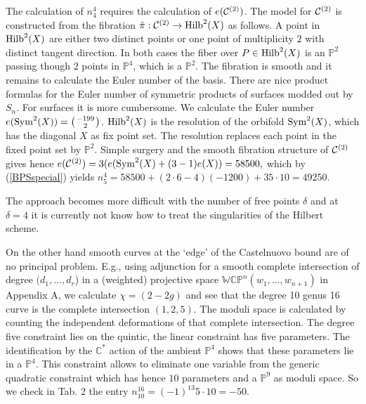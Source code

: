 \documentclass[12pt]{article}
\begin{document}
The calculation of $n^4_4$ requires the  calculation  of  $e({\cal C}^{(2)})$. The model
for ${\cal C}^{(2)}$ is constructed from the fibration  $\hat \pi:{\cal C}^{(2)}\rightarrow {\rm Hilb}^2(X)$
as follows. A point in ${\rm Hilb}^2(X)$ are either two distinct points or one point of multiplicity $2$ with  distinct
tangent direction.  In both cases the
fiber over $P \in {\rm Hilb}^2(X)$ is an $\mathbb{P}^2$ passing though $2$ points in $\mathbb{P}^4$,
which is a  $\mathbb{P}^2$. The fibration is smooth and it remains to calculate the Euler number
of the basis.
There are nice product formulas for the Euler number of symmetric
products of surfaces modded out by $S_n$. For surfaces it is more
cumbersome. We calculate the Euler number $e({\rm
Sym}^2(X))=\left(-199\atop 2\right)$. ${\rm Hilb}^2(X)$ is the
resolution of the  orbifold  ${\rm Sym}^2(X)$, which has the
diagonal $X$ as fix point set. The resolution replaces each point
in the fixed point set by $\mathbb{P}^2$. Simple surgery and  the
smooth fibration structure of  ${\cal C}^{(2)}$ gives hence
$e({\cal C}^{(2)})=3 (e({\rm Sym}^2(X)+(3-1)e(X))=58500,$ which by
(\ref{BPSspecial}) yields  $n^{4}_5=58500+(2\cdot 6-4)(-1200)+35
\cdot 10=49250$.

The approach becomes more difficult with the number of free points
$\delta$ and at $\delta=4$ it is currently not know how to treat
the singularities of the Hilbert scheme.

On the other hand smooth curves at the `edge' of the  Castelnuovo
bound are of no principal problem. E.g., using adjunction for a
smooth complete intersection of degree $(d_1,\ldots,d_r$) in a
(weighted) projective space $\mathbb{WCP}^n(w_1,\ldots,w_{n+1})$
in Appendix A, we calculate $\chi=(2-2g)$ and see that the degree
10 genus 16 curve is the complete intersection  $(1,2,5)$. The
moduli space is calculated by counting the independent
deformations of that complete intersection. The degree five
constraint lies on the quintic, the linear constraint has five
parameters. The identification by the $\mathbb{C}^*$ action of the
ambient $\mathbb{P}^4$ shows that these parameters lie in a
$\mathbb{P}^4$. This constraint allows to eliminate one variable
from the generic quadratic constraint  which has hence $10$
parameters and a $\mathbb{P}^9$ as moduli space. So we check in
Tab. 2 the entry $n^{16}_{10}=(-1)^{13} 5\cdot 10=-50$.
\end{document}
